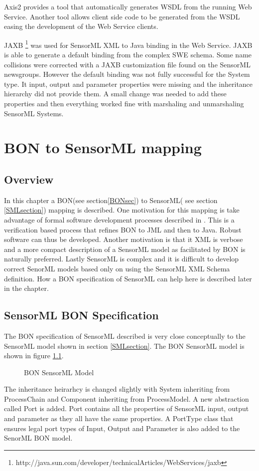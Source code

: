 \documentclass[]{final_report}
\begin{document}
Axis2 provides a tool that automatically generates WSDL from the running Web Service. Another tool allows client side code to be generated from the WSDL easing the development of the Web Service clients.

JAXB \footnote{http://java.sun.com/developer/technicalArticles/WebServices/jaxb} was used for SensorML XML to Java binding in the Web Service. JAXB is able to generate a default binding from the complex SWE schema. Some name collisions were corrected with a JAXB customization file found on the SensorML newsgroups. However the default binding was not fully successful for the System type. It input, output and parameter properties were missing and the inheritance hierarchy did not provide them. A small change was needed to add these properties and then everything worked fine with marshaling and unmarshaling SensorML Systems. 

\chapter{BON to SensorML mapping}
\section{Overview}
In this chapter a BON(see section\ref{BONsec}) to SensorML( see section \ref{SMLsection}) mapping is described. One motivation for this mapping is take advantage of formal software development processes described in \cite{Kiniryref}. This is a verification based process that refines BON to JML and then to Java. Robust software can thus be developed. Another motivation is that it XML is verbose and a more compact description of a SensorML model as facilitated by BON is naturally preferred. Lastly SensorML is complex and it is difficult to develop correct SenorML models based only on using the SensorML XML Schema definition. How a BON specification of SensorML can help here is described later in the chapter.

\section{SensorML BON Specification}
The BON specification of SensorML described is very close conceptually to the SensorML model shown in section \ref{SMLsection}.  The BON SensorML model is shown in figure \ref{fig:bonSensoMLModel}. 
\begin{figure}[h]
\centering
{}
\caption{BON SensorML Model}\label{fig:bonSensoMLModel}
\end{figure}
The inheritance heirarhcy is changed slightly with System inheriting from ProcessChain and Component inheriting from ProcessModel. A new abstraction called Port is added. Port contains all the properties of SensorML input, output and parameter as they all have the same properties. A PortType class that ensures legal port types of Input, Output and Parameter is also added to the SenorML BON model.
\end{document}
